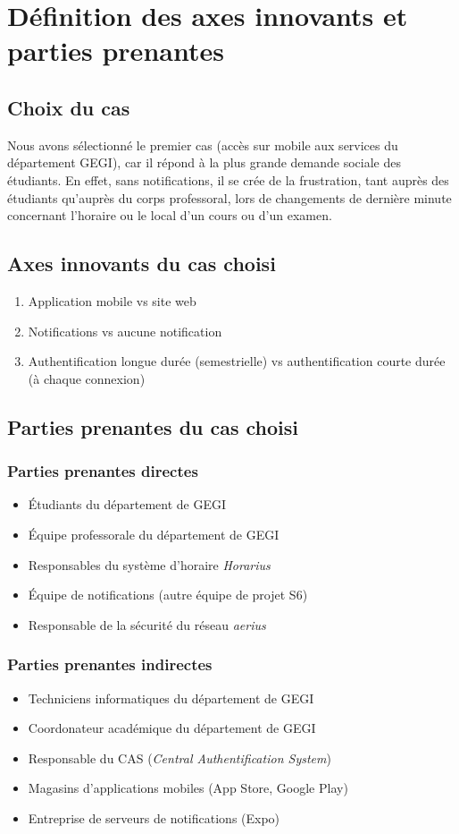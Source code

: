 \section{Définition des axes innovants et parties prenantes}
	\subsection{Choix du cas}
	Nous avons sélectionné le premier cas (accès sur mobile aux services du département GEGI), car il répond à la plus grande demande sociale des étudiants. En effet, sans notifications, il se crée de la frustration, tant auprès des étudiants qu'auprès du corps professoral, lors de changements de dernière minute concernant l'horaire ou le local d'un cours ou d'un examen.
	
	\subsection{Axes innovants du cas choisi}
	\begin{enumerate}
		\item Application mobile vs site web
		\item Notifications vs aucune notification
		\item Authentification longue durée (semestrielle) vs authentification courte durée (à chaque connexion)
	\end{enumerate}
	
	\subsection{Parties prenantes du cas choisi}
		\subsubsection{Parties prenantes directes}
		\begin{itemize}
			\item Étudiants du département de GEGI
			\item Équipe professorale du département de GEGI
			\item Responsables du système d'horaire \emph{Horarius}
			\item Équipe de notifications (autre équipe de projet S6)
			\item Responsable de la sécurité du réseau \emph{aerius}
		\end{itemize}
		
		\subsubsection{Parties prenantes indirectes}
		\begin{itemize}
			\item Techniciens informatiques du département de GEGI
			\item Coordonateur académique du département de GEGI
			\item Responsable du CAS (\emph{Central Authentification System})
			\item Magasins d'applications mobiles (App Store, Google Play)
			\item Entreprise de serveurs de notifications (Expo)
		\end{itemize}
	